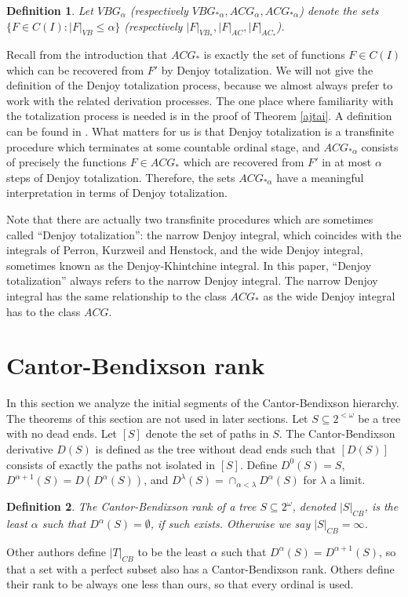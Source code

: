 \documentclass[12pt]{amsart}
\newtheorem{definition}{Definition}
\newcommand{\august}[1]{#1}%
\begin{document}
\begin{definition}
Let $VBG_\alpha$ (respectively $VBG_{\ast\alpha}, ACG_\alpha, ACG_{\ast\alpha}$) 
denote the sets $\{F \in C(I): |F|_{VB} \leq \alpha\}$ (respectively 
$|F|_{VB_\ast}, |F|_{AC}, |F|_{AC_\ast}$).
\end{definition}

Recall from the introduction that $ACG_\ast$ is exactly the set of 
functions $F \in C(I)$ which can be recovered from $F'$ by 
Denjoy totalization. 
We will not give the
definition of the Denjoy totalization process, 
\august{because we almost always prefer to work with
the related derivation 
processes. The one place where familiarity with 
the totalization process is needed
is in the proof of Theorem} \ref{ajtai}.  \august{A definition 
can be found in} \cite[Section VIII.5]{saks}. 
What matters for us is that Denjoy totalization is a transfinite 
procedure which terminates at some countable ordinal stage, and 
$ACG_{\ast\alpha}$ consists of precisely the functions $F \in ACG_\ast$ 
which are recovered from $F'$ in at most $\alpha$ steps of Denjoy 
totalization.  Therefore, the sets $ACG_{\ast\alpha}$ have a meaningful 
interpretation in terms of Denjoy totalization.

Note that there are actually two transfinite procedures which 
are sometimes called ``Denjoy totalization'': the narrow Denjoy 
integral, which coincides with the integrals of Perron, Kurzweil 
and Henstock, and the wide Denjoy integral, sometimes known as 
the Denjoy-Khintchine integral.  In this paper, ``Denjoy totalization'' 
always refers to the narrow Denjoy integral.  The narrow Denjoy 
integral has the same relationship to the class $ACG_\ast$ as 
the wide Denjoy integral has to the class $ACG$.

\section{Cantor-Bendixson rank}\label{sec:cantorBendixson}

In this section we analyze the initial segments of the Cantor-Bendixson 
hierarchy.  The theorems of this section are not used in later sections.
Let $S \subseteq 2^{<\omega}$ be a tree with no dead ends.  
Let $[S]$ denote the set of paths in $S$. 
The Cantor-Bendixson derivative $D(S)$ is defined as the tree without dead 
ends  such that $[D(S)]$ consists of exactly the paths not isolated in $[S]$.  
Define $D^0(S) = S$, $D^{\alpha+1}(S) = D(D^\alpha(S))$, and 
$D^\lambda(S) = \cap_{\alpha<\lambda} D^\alpha(S)$ for $\lambda$ a limit.
\begin{definition}
The Cantor-Bendixson rank of a tree $S\subseteq 2^\omega$, denoted $|S|_{CB}$, is the least $\alpha$ such that $D^\alpha(S) = \emptyset$, if such exists.  Otherwise we say $|S|_{CB} = \infty$.
\end{definition}
Other authors define $|T|_{CB}$ to be the least $\alpha$ such that 
$D^\alpha(S) = D^{\alpha+1}(S)$, so that a set with a perfect subset also has a 
Cantor-Bendixson rank.  Others define their rank to be always one less than ours, 
so that every ordinal is used.
\end{document}
